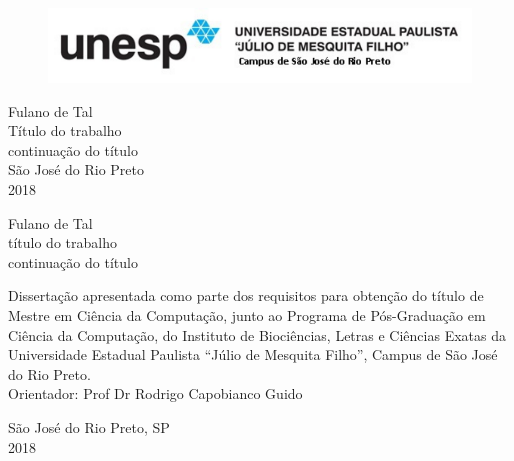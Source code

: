 \documentclass[a4paper,12pt,openright,oneside]{book}
\begin{document}

\thispagestyle{empty}
\begin{center}
\par \null
\begin{figure}[H]
\centering \includegraphics{unesp.pdf}
\end{figure} 
\vspace{3cm}
\fontsize{14}{\baselineskip} \selectfont
{Fulano de Tal} \\  
\vspace{4.5cm}
\onehalfspacing
\fontsize{14}{\baselineskip} \selectfont
{T\'{i}tulo do trabalho} \\ \onehalfspacing \fontsize{14}{\baselineskip} \selectfont
{continua\c{c}\~{a}o do t\'{i}tulo} \\
\vspace{7.0cm}
\fontsize{14}{\baselineskip} \selectfont  
{S\~ao Jos\'e do Rio Preto}\\ \vspace{1.0pt} 
{2018} 
\end{center}
\newpage
\thispagestyle{empty}
\setcounter{page}{1}
\begin{center}
\vspace{4cm}
\fontsize{14}{\baselineskip} \selectfont
\vspace{30.0pt}
{Fulano de Tal} \\ \vspace{30.0pt}
{t\'{i}tulo do trabalho} \\ \onehalfspacing \fontsize{14}{\baselineskip} \selectfont
{continua\c{c}\~{a}o do t\'{i}tulo} \\
\par \null
\begin{flushright}
\parbox{3.50in}{
\fontsize{12}{\baselineskip} \selectfont \onehalfspacing
Disserta\c c\~ao apresentada como parte dos requisitos para obten\c c\~ao do t\'itulo de Mestre em Ci\^encia da Computa\c c\~ao, junto ao Programa de P\'os-Gradua\c c\~ao em Ci\^encia da Computa\c c\~ao, do Instituto de Bioci\^encias, Letras e Ci\^encias Exatas da Universidade Estadual Paulista ``J\'ulio de Mesquita Filho'', Campus de S\~ao Jos\'e do Rio Preto. \\ \vspace{1.0pt}
{Orientador: Prof Dr Rodrigo Capobianco Guido } \\ \vspace{1.0pt}
}
\end{flushright}
\fontsize{14}{\baselineskip} \selectfont
\vspace{8.0cm}
S\~ao Jos\'e do Rio Preto, SP \\ \vspace{1.0pt}  
2018
\end{center}
\end{document}
